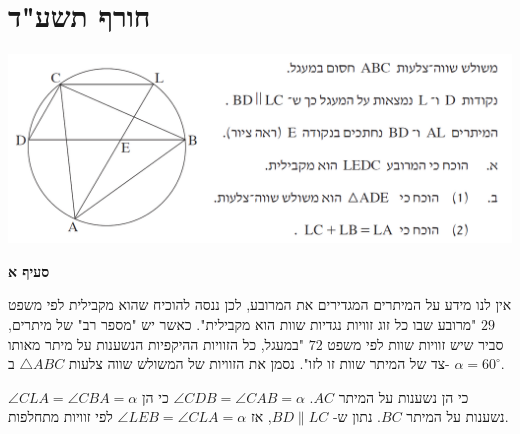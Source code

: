 \documentclass[12pt,a4paper]{article}
\begin{document}



\newpage

\section{חורף תשע"ד}

\begin{center}
\includegraphics[width=\textwidth]{winter-2014-4}
\end{center}

\vspace{-3ex}

\textbf{סעיף א}

אין לנו מידע על המיתרים המגדירים את המרובע, לכן ננסה להוכיח שהוא מקבילית לפי משפט
$29$
"מרובע שבו כל זוג זוויות נגדיות שוות הוא מקבילית". כאשר יש "מספר רב" של מיתרים, סביר שיש זוויות שוות לפי משפט
$72$
"במעגל, כל הזוויות ההיקפיות הנשענות על מיתר מאותו צד של המיתר שוות זו לזו". נסמן את הזוויות של המשולש שווה צלעות
$\triangle ABC$
ב-%
$\alpha=60^\circ$.


$\angle CLA=\angle CBA=\alpha$
כי הן נשענות על המיתר
$AC$.
$\angle CDB=\angle CAB=\alpha$
כי הן נשענות על המיתר
$BC$.
נתון ש-%
$BD\|LC$,
אז
$\angle LEB = \angle CLA = \alpha$
לפי זוויות מתחלפות.
\end{document}
